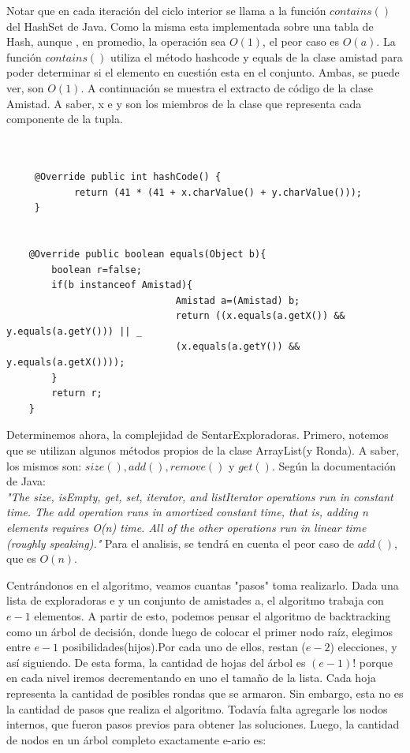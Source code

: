 \documentclass[10pt, a4paper]{article}
\begin{document}
Notar que en cada iteración del ciclo interior se llama a la función $contains()$ del HashSet de Java. Como la misma esta implementada sobre una tabla de Hash, aunque , en promedio, la operación sea $O(1)$, el peor caso es $O(a)$. La función $contains()$ utiliza el método hashcode y equals de la clase amistad para poder determinar si el elemento en cuestión esta en el conjunto. Ambas, se puede ver, son $O(1)$. A continuación se muestra el extracto de código de la clase Amistad. A saber, x e y son los miembros de la clase que representa cada componente de la tupla.
\begin{verbatim}


	 @Override public int hashCode() {
	        return (41 * (41 + x.charValue() + y.charValue()));
	 }

	 
	@Override public boolean equals(Object b){
		boolean r=false;
		if(b instanceof Amistad){
							  Amistad a=(Amistad) b;
							  return ((x.equals(a.getX()) && y.equals(a.getY())) || _
							  (x.equals(a.getY()) && y.equals(a.getX())));
		}
		return r;
	}

\end{verbatim}


Determinemos ahora, la complejidad de SentarExploradoras.
Primero, notemos que se utilizan algunos métodos propios de la clase ArrayList(y Ronda). A saber, los mismos son: $size(),add(),remove()$ y $get()$. Según la documentación de Java:\\

\textit{"The size, isEmpty, get, set, iterator, and listIterator operations run in constant time. The add operation runs in amortized constant time, that is, adding n elements requires O(n) time. All of the other operations run in linear time (roughly speaking)."} Para el analisis, se tendrá en cuenta el peor caso de $add()$, que es $O(n)$.

Centrándonos en el algoritmo, veamos cuantas "pasos" toma realizarlo.  Dada una lista de exploradoras e y un conjunto de amistades a, el algoritmo trabaja con $e-1$ elementos. A partir de esto, podemos pensar el algoritmo de backtracking como un árbol de decisión, donde luego de colocar el primer nodo raíz, elegimos entre $e-1$ posibilidades(hijos).Por cada uno de ellos, restan ($e-2$) elecciones, y así siguiendo. De esta forma, la cantidad de hojas del árbol es $(e-1)!$ porque en cada nivel iremos decrementando en uno el tamaño de la lista. Cada hoja representa la cantidad de posibles rondas que se armaron. Sin embargo, esta no es la cantidad de pasos que realiza el algoritmo. Todavía falta agregarle los nodos internos, que fueron pasos previos para obtener las soluciones. Luego, la cantidad de nodos en un árbol completo  exactamente e-ario es:
\end{document}
